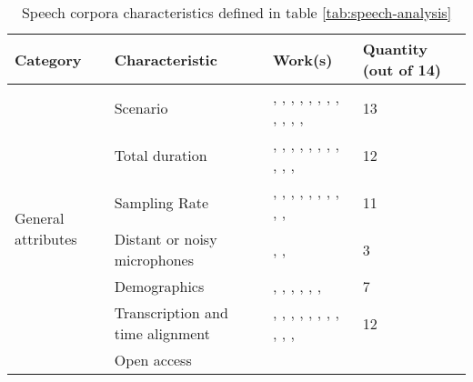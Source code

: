 \begin{landscape}

\begin{table*}[h]
\centering
\caption{Speech corpora characteristics defined in table \ref{tab:speech-analysis}}
\begin{tabular}{|p{4cm}|p{5cm}|p{7cm}|p{3.5cm}|}
\hline
Category & Characteristic & Work(s) & Quantity (out of 14)  \\ \hline
\multirow{7}{*}{General attributes} 
    & Scenario & 
    \cite{almeman2018building}, \cite{dwivedi2017documenting}, \cite{bougrine2017altruistic}, \cite{bougrine2017altruistic}, \cite{moore2017sheffield}, \cite{ramli2017first}, \cite{goldman2016siwis}, \cite{liu2016sheffield}, \cite{ruilan2016improving}, \cite{klessa2013paralingua}, \cite{nagino2008building},  \cite{clopper2006nationwide}, \cite{zhang2008improved} & 13
    \\ \cline{2-4} & Total duration &
    \cite{dwivedi2017documenting}, \cite{bougrine2017altruistic}, \cite{bougrine2017altruistic}, \cite{moore2017sheffield}, \cite{ramli2017first}, \cite{goldman2016siwis}, \cite{liu2016sheffield}, \cite{ruilan2016improving}, \cite{klessa2013paralingua}, \cite{nagino2008building}, \cite{clopper2006nationwide}, \cite{zhang2008improved} & 12
    \\ \cline{2-4} & Sampling Rate &
    \cite{almeman2018building}, \cite{dwivedi2017documenting}, \cite{bougrine2017altruistic}, \cite{ng2017shefce}, \cite{moore2017sheffield}, \cite{ramli2017first}, \cite{goldman2016siwis}, \cite{liu2016sheffield}, \cite{ruilan2016improving}, \cite{klessa2013paralingua}, \cite{clopper2006nationwide} & 11
    \\ \cline{2-4}& Distant or noisy microphones & 
    \cite{moore2017sheffield}, \cite{ramli2017first}, \cite{liu2016sheffield} & 3
    \\ \cline{2-4} & Demographics &
    \cite{dwivedi2017documenting}, \cite{bougrine2017altruistic}, \cite{ng2017shefce}, \cite{goldman2016siwis}, \cite{ruilan2016improving}, \cite{klessa2013paralingua}, \cite{clopper2006nationwide} & 7
    \\ \cline{2-4} & Transcription and time alignment & %
    \cite{dwivedi2017documenting}, \cite{bougrine2017altruistic}, \cite{bougrine2017altruistic}, \cite{ng2017shefce}, \cite{moore2017sheffield}, \cite{ramli2017first}, \cite{goldman2016siwis}, \cite{liu2016sheffield}, \cite{ruilan2016improving}, \cite{klessa2013paralingua}, \cite{nagino2008building}, \cite{clopper2006nationwide} & 12
    \\ \cline{2-4} & Open access &

\end{tabular}
\end{table*}
\end{landscape}
